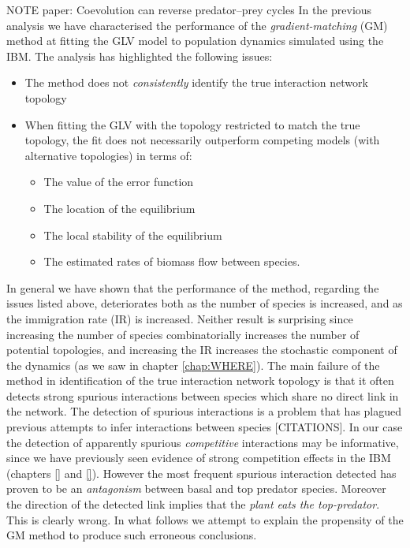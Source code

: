\documentclass[12pt]{article}
\begin{document}
NOTE paper: Coevolution can reverse predator–prey cycles
In the previous analysis we have characterised the performance of the \emph{gradient-matching} (GM) method at fitting the GLV model to population dynamics simulated using the IBM. The analysis has highlighted the following issues:
\begin{itemize}
	\item The method does not \emph{consistently} identify the true interaction network topology
	\item When fitting the GLV with the topology restricted to match the true topology, the fit does not necessarily outperform competing models (with alternative topologies) in terms of:
		\begin{itemize}
			\item The value of the error function
			\item The location of the equilibrium
			\item The local stability of the equilibrium
			\item The estimated rates of biomass flow between species.
		\end{itemize}		   
\end{itemize}
In general we have shown that the performance of the method, regarding the issues listed above, deteriorates both as the number of species is increased, and as the immigration rate (IR) is increased. Neither result is surprising since increasing the number of species combinatorially increases the number of potential topologies, and increasing the IR increases the stochastic component of the dynamics (as we saw in chapter \ref{chap:WHERE}). The main failure of the method in identification of the true interaction network topology is that it often detects strong spurious interactions between species which share no direct link in the network. The detection of spurious interactions is a problem that has plagued previous attempts to infer interactions between species [CITATIONS]. In our case the detection of apparently spurious \emph{competitive} interactions may be informative, since we have previously seen evidence of strong competition effects in the IBM (chapters \ref{} and \ref{}). However the most frequent spurious interaction detected has proven to be an \emph{antagonism} between basal and top predator species. Moreover the direction of the detected link implies that the \emph{plant eats the top-predator}. This is clearly wrong. In what follows we attempt to explain the propensity of the GM method to produce such erroneous conclusions. 
\end{document}
